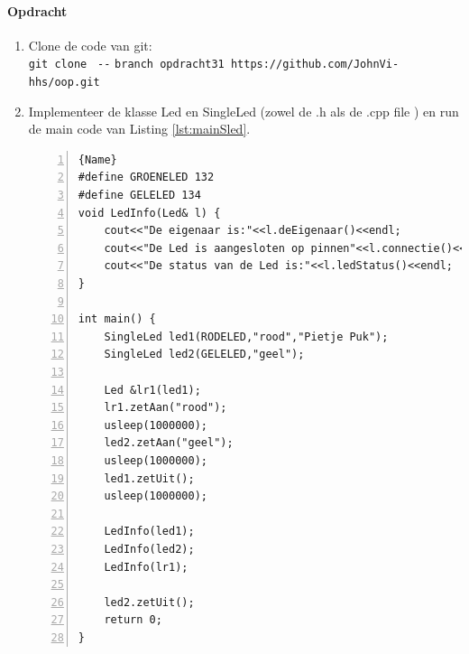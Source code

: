 \paragraph{Opdracht} 
\begin{enumerate}[label=(\alph*)]
\item Clone de code van git: \\
{\small \texttt{git clone } \verb|--| \texttt{branch opdracht31 https://github.com/JohnVi-hhs/oop.git}}
\item
Implementeer de klasse Led en SingleLed (zowel de .h als de .cpp file ) en run de main code van Listing \ref{lst:mainSled}.

\begin{lstlisting}[caption=main functie om de klasse SingleLed te testen. ,frame=trbl,firstnumber=1,numbers=left,label={lst:mainSled}]{Name}
#define GROENELED 132
#define GELELED 134
void LedInfo(Led& l) {
	cout<<"De eigenaar is:"<<l.deEigenaar()<<endl;
	cout<<"De Led is aangesloten op pinnen"<<l.connectie()<<endl;
	cout<<"De status van de Led is:"<<l.ledStatus()<<endl;
}

int main() {
	SingleLed led1(RODELED,"rood","Pietje Puk");
	SingleLed led2(GELELED,"geel");
	
	Led &lr1(led1);
	lr1.zetAan("rood");
	usleep(1000000);
	led2.zetAan("geel"); 
	usleep(1000000);
	led1.zetUit();
	usleep(1000000);
	
	LedInfo(led1);
	LedInfo(led2);
	LedInfo(lr1);
	
	led2.zetUit();
	return 0;
}

\end{lstlisting}


\end{enumerate}
